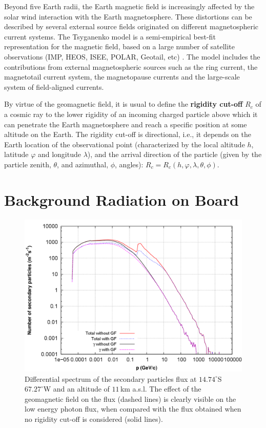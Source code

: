 \documentclass[3p,times,twocolumn]{elsarticle}
\begin{document}
Beyond five Earth radii, the Earth magnetic field is increasingly affected by
the solar wind interaction with the Earth magnetosphere. These distortions can
be described by several external source fields originated on different
magnetospheric current systems. The Tsyganenko model\cite{Tsyganenko2002} is a
semi-empirical best-fit representation for the magnetic field, based on a large
number of satellite observations (IMP, HEOS, ISEE, POLAR, Geotail, etc)
\cite{woodfield_comparison_2007}. The model includes the contributions from
external magnetospheric sources such as the ring current, the magnetotail
current system, the magnetopause currents and the large-scale system of
field-aligned currents.

By virtue of the geomagnetic field, it is usual to define the {\bf{rigidity
cut-off}} $R_c$ of a cosmic ray to the lower rigidity of an incoming charged
particle above which it can penetrate the Earth magnetosphere and reach a
specific position at some altitude on the Earth. The rigidity cut-off is
directional, i.e., it depends on the Earth location of the observational point
(characterized by the local altitude $h$, latitude $\varphi$ and longitude
$\lambda$), and the arrival direction of the particle (given by the particle
zenith, $\theta$, and azimuthal, $\phi$, angles): $R_c=R_c(h, \varphi, \lambda,
\theta, \phi)$.

\section{Background Radiation on Board}\label{sec:strategy}

\begin{figure}[t!]
\centering
\includegraphics[scale=.14]{g2_efectogeo.png}
\caption{Differential spectrum of the secondary particles flux at
$14.74^\circ$S $67.27^\circ$W and an altitude of $11$\,km a.s.l. The effect of
the geomagnetic field on the flux (dashed lines) is clearly visible on the
low energy photon flux, when compared with the flux obtained when no rigidity
cut-off is considered (solid lines).}\label{fig:geo_effect}
\end{figure}
\end{document}
